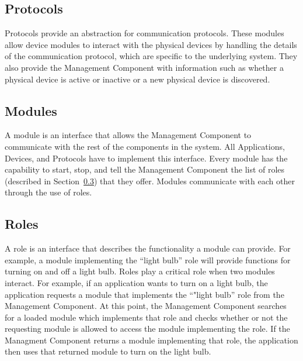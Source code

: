 \subsection{Protocols}
\label{sec:protocols}
Protocols provide an abstraction for communication protocols. These modules
allow device modules to interact with the physical devices by handling the
details of the communication protocol, which are specific to the underlying
system. They also provide the Management Component with information such as
whether a physical device is active or inactive or a new physical device is
discovered.
\subsection{Modules}
\label{sec:mods}
A module is an interface that allows the Management Component to communicate
with the rest of the components in the system. All Applications, Devices, and
Protocols have to implement this interface. Every module has the capability to
start, stop, and tell the Management Component the list of roles (described in 
Section~\ref{sec:roles}) that they offer. Modules communicate with each
other through the use of roles.
\subsection{Roles}
\label{sec:roles}
A role is an interface that describes the functionality a module can provide. 
For example, a module implementing the ``light bulb'' role will provide functions
for turning on and off a light bulb. Roles play a critical role when two
modules interact. For example, if an application wants to turn on a light bulb,
the application requests a module that implements the ``"light bulb'' role from 
the Management Component. At this point, the Management Component searches for a
loaded module which implements that role and checks whether or not the
requesting module is allowed to access the module implementing the role. If the
Managment Component returns a module implementing that role, the application
then uses that returned module to turn on the light bulb.

